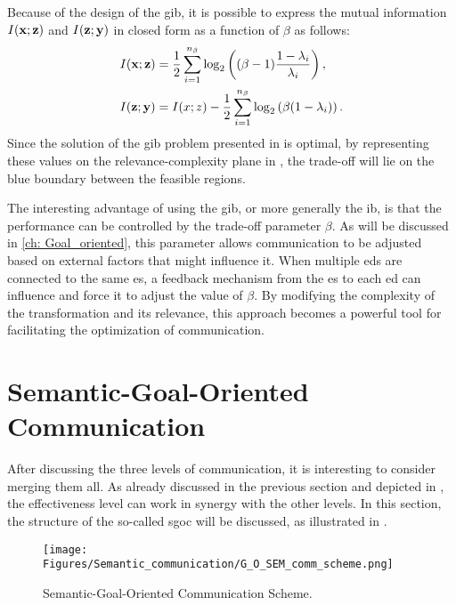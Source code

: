Because of the design of the \gls{gib}, it is possible to express the mutual information $I(\mathbf{x}; \mathbf{z})$ and $I(\mathbf{z}; \mathbf{y})$ in closed form as a function of $\beta$ as follows:
\begin{align}
    &I(\mathbf{x}; \mathbf{z})=\frac{1}{2} \sum_{i=1}^{n_{\beta}} \log_2\left((\beta-1)\frac{1-\lambda_i}{\lambda_i}\right),\\
    &I(\mathbf{z}; \mathbf{y})=I(x; z)-\frac{1}{2} \sum_{i=1}^{n_{\beta}}\log_2\left(\beta(1-\lambda_i)\right).
\end{align}
Since the solution of the \gls{gib} problem presented in \cite{Chechik2004GIB} is optimal, by representing these values on the relevance-complexity plane in , the trade-off will lie on the blue boundary between the feasible regions.

The interesting advantage of using the \gls{gib}, or more generally the \gls{ib}, is that the performance can be controlled by the trade-off parameter $\beta$. As will be discussed in \cref{ch: Goal_oriented}, this parameter allows communication to be adjusted based on external factors that might influence it. When multiple \glspl{ed} are connected to the same \gls{es}, a feedback mechanism from the \gls{es} to each \gls{ed} can influence and force it to adjust the value of $\beta$. By modifying the complexity of the transformation and its relevance, this approach becomes a powerful tool for facilitating the optimization of communication.

\section{Semantic-Goal-Oriented Communication} \label{sec: SEMCOM sem_go}
After discussing the three levels of communication, it is interesting to consider merging them all. As already discussed in the previous section and depicted in , the effectiveness level can work in synergy with the other levels. In this section, the structure of the so-called \gls{sgoc} will be discussed, as illustrated in .

\begin{figure}
    \centering
    \texttt{[image: Figures/Semantic\_communication/G\_O\_SEM\_comm\_scheme.png]}
    \caption[Semantic-Goal-Oriented Communication Scheme]{Semantic-Goal-Oriented Communication Scheme.}
    \label{fig: SEMCOM sem_go_comm_scheme}
\end{figure}

